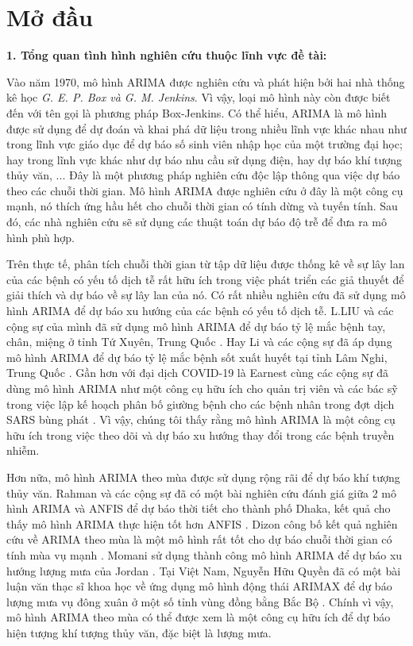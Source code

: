 \thispagestyle{empty}
\chapter*{Mở đầu}
\noindent 
{\bf 1. Tổng quan tình hình nghiên cứu thuộc lĩnh vực đề tài:}

Vào năm 1970, mô hình ARIMA được nghiên cứu và phát hiện bởi hai nhà thống kê học \textit{G. E. P. Box và G. M. Jenkins}. Vì vậy, loại mô hình này còn được biết đến với tên gọi là phương pháp Box-Jenkins. Có thể hiểu, ARIMA là mô hình được sử dụng để dự đoán và khai phá dữ liệu trong nhiều lĩnh vực khác nhau như trong lĩnh vực giáo dục để dự báo số sinh viên nhập học của một trường đại học; hay trong lĩnh vực khác như dự báo nhu cầu sử dụng điện, hay dự báo khí tượng thủy văn, ... Đây là một phương pháp nghiên cứu độc lập thông qua việc dự báo theo các chuỗi thời gian. Mô hình ARIMA được nghiên cứu ở đây là một công cụ mạnh, nó thích ứng hầu hết cho chuỗi thời gian có tính dừng và tuyến tính. Sau đó, các nhà nghiên cứu sẽ sử dụng các thuật toán dự báo độ trễ để đưa ra mô hình phù hợp. 

Trên thực tế, phân tích chuỗi thời gian từ tập dữ liệu được thống kê về sự lây lan của các bệnh có yếu tố dịch tễ rất hữu ích trong việc phát triển các giả thuyết để giải thích và dự báo về sự lây lan của nó. Có rất nhiều nghiên cứu đã sử dụng mô hình ARIMA để dự báo xu hướng của các bệnh có yếu tố dịch tễ. L.LIU và các cộng sự của mình đã sử dụng mô hình ARIMA để dự báo tỷ lệ mắc bệnh tay, chân, miệng ở tỉnh Tứ Xuyên, Trung Quốc \cite{1}. Hay Li và các cộng sự đã áp dụng mô hình ARIMA để dự báo tỷ lệ mắc bệnh sốt xuất huyết tại tỉnh Lâm Nghi, Trung Quốc \cite{2}. Gần hơn với đại dịch COVID-19 là Earnest cùng các cộng sự đã dùng mô hình ARIMA như một công cụ hữu ích cho quản trị viên và các bác sỹ trong việc lập kế hoạch phân bố giường bệnh cho các bệnh nhân trong đợt dịch SARS bùng phát \cite{3}. Vì vậy, chúng tôi thấy rằng mô hình ARIMA là một công cụ hữu ích trong việc theo dõi và dự báo xu hướng thay đổi trong các bệnh truyền nhiễm.

Hơn nữa, mô hình ARIMA theo mùa được sử dụng rộng rãi để dự báo khí tượng thủy văn. Rahman và các cộng sự đã có một bài nghiên cứu đánh giá giữa 2 mô hình ARIMA và ANFIS để dự báo thời tiết cho thành phố Dhaka, kết quả cho thấy mô hình ARIMA thực hiện tốt hơn ANFIS \cite{4}. Dizon công bố kết quả nghiên cứu về ARIMA theo mùa là một mô hình rất tốt cho dự báo chuỗi thời gian có tính mùa vụ mạnh \cite{5}. Momani sử dụng thành công mô hình ARIMA để dự báo xu hướng lượng mưa của Jordan \cite{6}. Tại Việt Nam, Nguyễn Hữu Quyền đã có một bài luận văn thạc sĩ khoa học về ứng dụng mô hình động thái ARIMAX để dự báo lượng mưa vụ đông xuân ở một số tỉnh vùng đồng bằng Bắc Bộ \cite{7}. Chính vì vậy, mô hình ARIMA theo mùa có thể được xem là một công cụ hữu ích để dự báo hiện tượng khí tượng thủy văn, đặc biệt là lượng mưa.

